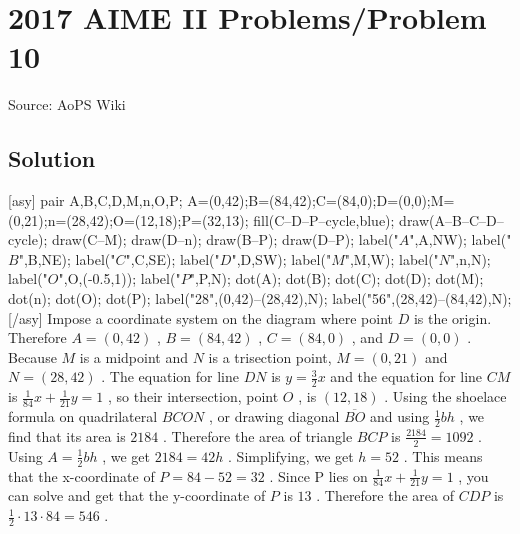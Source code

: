 \documentclass[12pt]{article}
\begin{document}
\section*{{2017 AIME II Problems/Problem 10}}
Source: AoPS Wiki

\subsection*{Solution}
[asy] pair A,B,C,D,M,n,O,P; A=(0,42);B=(84,42);C=(84,0);D=(0,0);M=(0,21);n=(28,42);O=(12,18);P=(32,13); fill(C--D--P--cycle,blue); draw(A--B--C--D--cycle); draw(C--M); draw(D--n); draw(B--P); draw(D--P); label("$A$",A,NW); label("$B$",B,NE); label("$C$",C,SE); label("$D$",D,SW); label("$M$",M,W); label("$N$",n,N); label("$O$",O,(-0.5,1)); label("$P$",P,N); dot(A); dot(B); dot(C); dot(D); dot(M); dot(n); dot(O); dot(P); label("28",(0,42)--(28,42),N); label("56",(28,42)--(84,42),N); [/asy] Impose a coordinate system on the diagram where point $D$ is the origin. Therefore $A=(0,42)$ , $B=(84,42)$ , $C=(84,0)$ , and $D=(0,0)$ . Because $M$ is a midpoint and $N$ is a trisection point, $M=(0,21)$ and $N=(28,42)$ . The equation for line $DN$ is $y=\frac{3}{2}x$ and the equation for line $CM$ is $\frac{1}{84}x+\frac{1}{21}y=1$ , so their intersection, point $O$ , is $(12,18)$ . Using the shoelace formula on quadrilateral $BCON$ , or drawing diagonal $\overline{BO}$ and using $\frac12bh$ , we find that its area is $2184$ . Therefore the area of triangle $BCP$ is $\frac{2184}{2} = 1092$ . Using $A = \frac 12 bh$ , we get $2184 = 42h$ . Simplifying, we get $h = 52$ . This means that the x-coordinate of $P = 84 - 52 = 32$ . Since P lies on $\frac{1}{84}x+\frac{1}{21}y=1$ , you can solve and get that the y-coordinate of $P$ is $13$ . Therefore the area of $CDP$ is $\frac{1}{2} \cdot 13 \cdot 84=\boxed{546}$ .
\end{document}
